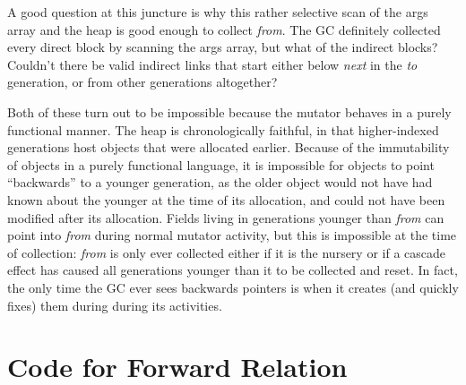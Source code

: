 A good question at this juncture is why this rather selective scan 
of the args array and the heap is good enough to collect \emph{from}. 
The GC definitely collected every direct block by scanning the args array,
but what of the indirect blocks? Couldn't there be valid indirect links
that start either below \emph{next} in the \emph{to} generation, 
or from other generations altogether? 

Both of these turn out to be impossible because the 
mutator behaves in a purely functional manner.
The heap is chronologically
faithful, in that higher-indexed generations host
objects that were allocated earlier. Because
of the immutability of objects in a purely functional language, 
it is impossible for objects to point ``backwards'' to 
a younger generation, as the older object would not have
had known about the younger at the time of its allocation, and could not 
have been modified after its allocation. Fields living in generations 
younger than \emph{from} can point into \emph{from} during 
normal mutator activity, but this is
impossible at the time of collection: 
\emph{from} is only ever collected either if it is
the nursery or if a cascade effect has caused all generations younger
than it to be collected and reset. 
In fact, the only time the GC ever sees backwards pointers
is when it creates (and quickly fixes) them during during its 
activities.
\newpage
\section{Code for Forward Relation}
\label{apx:forwardrelation}



% 
